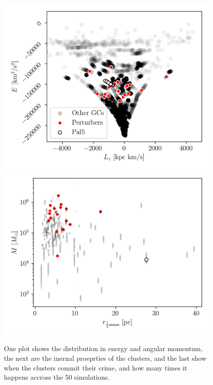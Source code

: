 \documentclass[]{aa}
\begin{document}
  \begin{figure}
    \centering
    \includegraphics[width=1\linewidth]{E_Lz_perturbers.png}
    \includegraphics[width=1\linewidth]{mass_size_plane.png}
    \caption{One plot shows the distribution in energy and angular momentum, the next are the inernal proeprties of the clusters, and the last show when the clusters commit their crime, and how many times it happens accross the 50 simulations. }
    \label{fig:mass_size_plane}
  \end{figure}
  
\end{document}
